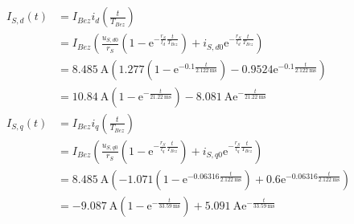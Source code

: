 \documentclass[11pt,a4paper]{scrartcl}
\newcommand{\mybr}[1]{\left(#1\right)}
\newcommand{\0}{_{\mybr{0}}}
\newcommand{\1}{_{\mybr{1}}}
\newcommand{\2}{_{\mybr{2}}}
\renewcommand{\e}{\mathrm{e}}
\begin{document}
\subsection{}
\begin{align}
I_{S,d}\mybr{t}&=I_{Bez}i_d\mybr{\frac{t}{T_{Bez}}}\\
&=I_{Bez}\mybr{\frac{u_{S,d0}}{r_S}\mybr{1-\e^{-\frac{r_S}{l_d}\frac{t}{T_{Bez}}}}+i_{S,d0}\e^{-\frac{r_S}{l_d}\frac{t}{T_{Bez}}}}\\
&=\SI{8.485}{\ampere}\mybr{\num{1.277}\mybr{1-\e^{\num{-0.1}\frac{t}{\SI{2.122}{\milli\second}}}}-\num{0.9524}\e^{\num{-0.1}\frac{t}{\SI{2.122}{\milli\second}}}}\\
&=\SI{10.84}{\ampere}\mybr{1-\e^{-\frac{t}{\SI{21.22}{\milli\second}}}}-\SI{8.081}{\ampere}\e^{-\frac{t}{\SI{21.22}{\milli\second}}}\\
I_{S,q}\mybr{t}&=I_{Bez}i_q\mybr{\frac{t}{T_{Bez}}}\\
&=I_{Bez}\mybr{\frac{u_{S,q0}}{r_S}\mybr{1-\e^{-\frac{r_S}{l_q}\frac{t}{T_{Bez}}}}+i_{S,q0}\e^{-\frac{r_S}{l_q}\frac{t}{T_{Bez}}}}\\
&=\SI{8.485}{\ampere}\mybr{\num{-1.071}\mybr{1-\e^{\num{-0.06316}\frac{t}{\SI{2.122}{\milli\second}}}}+\num{0.6}\e^{\num{-0.06316}\frac{t}{\SI{2.122}{\milli\second}}}}\\
&=\SI{-9.087}{\ampere}\mybr{1-\e^{-\frac{t}{\SI{33.59}{\milli\second}}}}+\SI{5.091}{\ampere}\e^{-\frac{t}{\SI{33.59}{\milli\second}}}\\
\end{align}

\begin{figure*}[!ht]
	\centering
\end{figure*}


\clearpage
\end{document}
